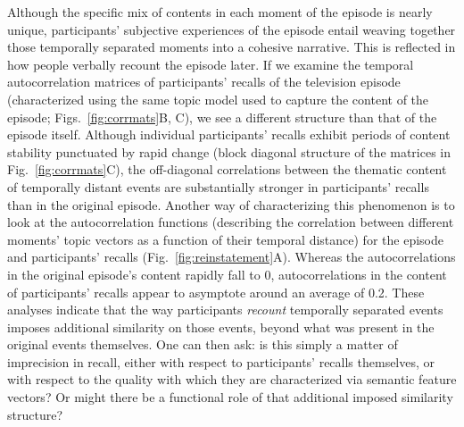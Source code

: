 \documentclass{article}
\begin{document}
Although the specific mix of contents in each moment of the episode is nearly unique, participants' subjective experiences of the episode entail weaving together those temporally separated moments into a cohesive narrative.  This is reflected in how people verbally recount the episode later.  If we examine the temporal autocorrelation matrices of participants' recalls of the television episode (characterized using the same topic model used to capture the content of the episode; Figs.~\ref{fig:corrmats}B, C), we see a different structure than that of the episode itself.  Although individual participants' recalls exhibit periods of content stability punctuated by rapid change (block diagonal structure of the matrices in Fig.~\ref{fig:corrmats}C), the off-diagonal correlations between the thematic content of temporally distant events are substantially stronger in participants' recalls than in the original episode.  Another way of characterizing this phenomenon is to look at the autocorrelation functions (describing the correlation between different moments' topic vectors as a function of their temporal distance) for the episode and participants' recalls (Fig.~\ref{fig:reinstatement}A).  Whereas the autocorrelations in the original episode's content rapidly fall to 0, autocorrelations in the content of participants' recalls appear to asymptote around an average of 0.2.  These analyses indicate that the way participants \textit{recount} temporally separated events imposes additional similarity on those events, beyond what was present in the original events themselves.  One can then ask: is this simply a matter of imprecision in recall, either with respect to participants' recalls themselves, or with respect to the quality with which they are characterized via semantic feature vectors?  Or might there be a functional role of that additional imposed similarity structure?
\end{document}
